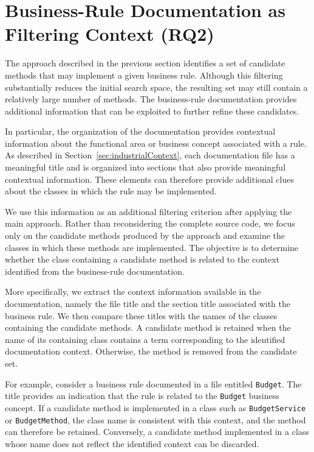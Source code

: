 \section{Business-Rule Documentation as Filtering Context (RQ2)}
\label{sec:useDocumentation}

The approach described in the previous section identifies a set of candidate methods that may implement a given business rule. Although this filtering substantially reduces the initial search space, the resulting set may still contain a relatively large number of methods. The business-rule documentation provides additional information that can be exploited to further refine these candidates.

In particular, the organization of the documentation provides contextual information about the functional area or business concept associated with a rule. As described in Section~\ref{sec:industrialContext}, each documentation file has a meaningful title and is organized into sections that also provide meaningful contextual information. These elements can therefore provide additional clues about the classes in which the rule may be implemented.

We use this information as an additional filtering criterion after applying the main approach. Rather than reconsidering the complete source code, we focus only on the candidate methods produced by the approach and examine the classes in which these methods are implemented. The objective is to determine whether the class containing a candidate method is related to the context identified from the business-rule documentation.

More specifically, we extract the context information available in the documentation, namely the file title and the section title associated with the business rule. We then compare these titles with the names of the classes containing the candidate methods. A candidate method is retained when the name of its containing class contains a term corresponding to the identified documentation context. Otherwise, the method is removed from the candidate set.

For example, consider a business rule documented in a file entitled \texttt{Budget}. The title provides an indication that the rule is related to the \texttt{Budget} business concept. If a candidate method is implemented in a class such as \texttt{BudgetService} or \texttt{BudgetMethod}, the class name is consistent with this context, and the method can therefore be retained. Conversely, a candidate method implemented in a class whose name does not reflect the identified context can be discarded.

